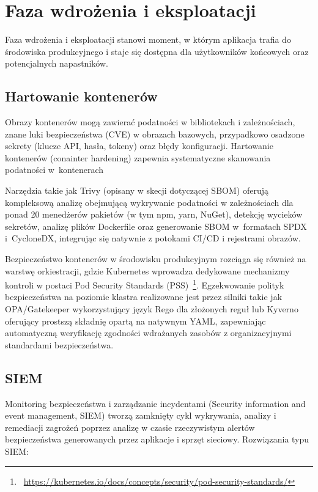 \section{Faza wdrożenia i eksploatacji}

Faza wdrożenia i eksploatacji stanowi moment, w którym aplikacja trafia do środowiska produkcyjnego i staje się dostępna dla użytkowników końcowych oraz potencjalnych napastników.

\subsection{Hartowanie kontenerów}

Obrazy kontenerów mogą zawierać podatności w bibliotekach i zależnościach, znane luki bezpieczeństwa (CVE) w obrazach bazowych, przypadkowo osadzone sekrety (klucze API, hasła, tokeny) oraz błędy konfiguracji. Hartowanie kontenerów (conainter hardening) zapewnia systematyczne skanowania podatności w~kontenerach

Narzędzia takie jak Trivy (opisany w skecji dotyczącej SBOM) oferują kompleksową analizę obejmującą wykrywanie podatności w zależnościach dla ponad 20 menedżerów pakietów (w tym npm, yarn, NuGet), detekcję wycieków sekretów, analizę plików Dockerfile oraz generowanie SBOM w~formatach SPDX i~CycloneDX, integrując się natywnie z potokami CI/CD i rejestrami obrazów.

Bezpieczeństwo kontenerów w środowisku produkcyjnym rozciąga się również na warstwę orkiestracji, gdzie Kubernetes wprowadza dedykowane mechanizmy kontroli w postaci Pod Security Standards (PSS)~\footnote{~\url{https://kubernetes.io/docs/concepts/security/pod-security-standards/}}. Egzekwowanie polityk bezpieczeństwa na poziomie klastra realizowane jest przez silniki takie jak OPA/Gatekeeper wykorzystujący język Rego dla złożonych reguł lub Kyverno oferujący prostszą składnię opartą na natywnym YAML, zapewniając automatyczną weryfikację zgodności wdrażanych zasobów z organizacyjnymi standardami bezpieczeństwa.

\subsection{SIEM}

Monitoring bezpieczeństwa i zarządzanie incydentami (Security information and event management, SIEM) tworzą zamknięty cykl wykrywania, analizy i remediacji zagrożeń poprzez analizę w czasie rzeczywistym alertów bezpieczeństwa generowanych przez aplikacje i sprzęt sieciowy. Rozwiązania typu SIEM:


